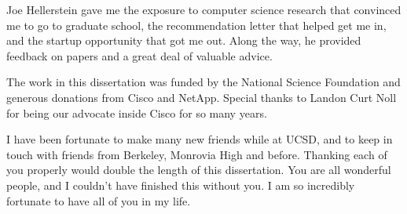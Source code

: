 \begin{acknowledgements}
Joe Hellerstein gave me the exposure to computer science research that
convinced me to go to graduate school, the recommendation letter that helped
get me in, and the startup opportunity that got me out. Along the way, he
provided feedback on papers and a great deal of valuable advice.

The work in this dissertation was funded by the National Science Foundation and
generous donations from Cisco and NetApp. Special thanks to Landon Curt Noll
for being our advocate inside Cisco for so many years.

I have been fortunate to make many new friends while at UCSD, and to keep in
touch with friends from Berkeley, Monrovia High and before. Thanking each of
you properly would double the length of this dissertation. You are all
wonderful people, and I couldn't have finished this without you. I am so
incredibly fortunate to have all of you in my life.







\end{acknowledgements}
